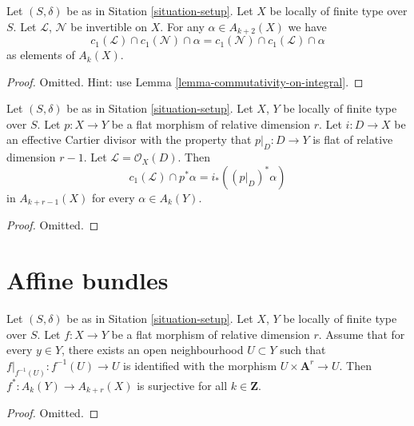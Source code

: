 \begin{lemma}
\label{lemma-cap-commutative}
Let $(S, \delta)$ be as in Sitation \ref{situation-setup}.
Let $X$ be locally of finite type over $S$.
Let $\mathcal{L}$, $\mathcal{N}$ be invertible on $X$.
For any $\alpha \in A_{k + 2}(X)$ we have
$$
c_1(\mathcal{L}) \cap c_1(\mathcal{N}) \cap \alpha
=
c_1(\mathcal{N}) \cap c_1(\mathcal{L}) \cap \alpha
$$
as elements of $A_k(X)$.
\end{lemma}

\begin{proof}
Omitted. Hint: use Lemma \ref{lemma-commutativity-on-integral}.
\end{proof}

\begin{lemma}
\label{lemma-relative-effective-cartier}
Let $(S, \delta)$ be as in Sitation \ref{situation-setup}.
Let $X$, $Y$ be locally of finite type over $S$.
Let $p : X \to Y$ be a flat morphism of relative dimension $r$.
Let $i : D \to X$ be an effective Cartier divisor with the property
that $p|_D : D \to Y$ is flat of relative dimension $r - 1$.
Let $\mathcal{L} = \mathcal{O}_X(D)$.
Then
$$
c_1(\mathcal{L}) \cap p^*\alpha = i_* ((p|_D)^*\alpha)
$$
in $A_{k + r - 1}(X)$ for every $\alpha \in A_k(Y)$.
\end{lemma}

\begin{proof}
Omitted.
\end{proof}








\section{Affine bundles}
\label{section-affine-vector}

\begin{lemma}
\label{lemma-pullback-affine-fibres-surjective}
Let $(S, \delta)$ be as in Sitation \ref{situation-setup}.
Let $X$, $Y$ be locally of finite type over $S$.
Let $f : X \to Y$ be a flat morphism of relative dimension $r$.
Assume that for every $y \in Y$, there exists an open neighbourhood
$U \subset Y$ such that $f|_{f^{-1}(U)} : f^{-1}(U) \to U$
is identified with the morphism $U \times \mathbf{A}^r \to U$.
Then $f^* : A_k(Y) \to A_{k + r}(X)$ is surjective for all
$k \in \mathbf{Z}$.
\end{lemma}

\begin{proof}
Omitted.
\end{proof}






